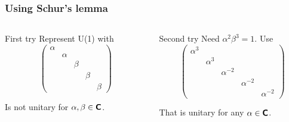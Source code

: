 \documentclass[english, fleqn]{beamer}
\begin{document}
\begin{frame}
    \frametitle{Using Schur's lemma}

    \begin{columns}[t]
        \begin{column}{.5\textwidth}
            \begin{block}{First try}
                Represent U(1) with
                \[
                    \begin{pmatrix}
                        \alpha &&&& \\
                        & \alpha &&& \\
                        && \beta && \\
                        &&& \beta & \\
                        &&&& \beta
                    \end{pmatrix}
                \]

                Is not unitary for $\alpha, \beta \in \text{\bfseries\sffamily{C}}$.
            \end{block}
        \end{column}
        \begin{column}{.5\textwidth}
            \begin{block}{Second try}
                Need $\alpha^2 \beta^3 = 1$. Use
                \[
                    \begin{pmatrix}
                        \alpha^3 &&&& \\
                        & \alpha^3 &&& \\
                        && \alpha^{-2} && \\
                        &&& \alpha^{-2} & \\
                        &&&& \alpha^{-2}
                    \end{pmatrix}
                \]
                
                That is unitary for any $\alpha \in \text{\bfseries\sffamily{C}}$.
            \end{block}
        \end{column}
    \end{columns}
\end{frame}
\end{document}
